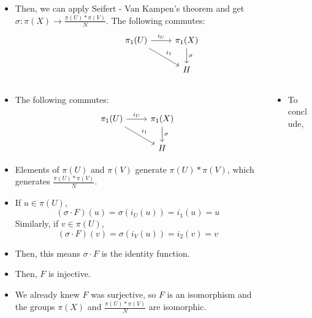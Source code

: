 \documentclass[8pt]{beamer}
\begin{document}
\begin{frame}
\begin{columns}
\begin{column}[T]{0.5\textwidth}
\begin{itemize}
          \item<5-> Then, we can apply Seifert - Van Kampen's theorem and get
            $\sigma :
              \pi(X) \rightarrow \frac{\pi(U)*\pi(V)}{N}$.
            The following commutes:
            \[\begin{tikzcd}[ampersand replacement=\&]
                \pi_1(U) \ar[rd, "i_1"] \ar[r, "i_U"] \&
                \pi_1(X) \ar[d, "\sigma"] \\ \& H \end{tikzcd}\]
          \end{itemize}
        \end{column}
    \end{columns}
  \end{frame}
  \begin{frame}
    \begin{columns}
      \begin{column}[T]{0.5\textwidth}
        \begin{itemize}
          \item<1-> The following commutes:
            \[\begin{tikzcd}[ampersand replacement=\&]
                \pi_1(U) \ar[rd, "i_1"] \ar[r, "i_U"] \&
                \pi_1(X) \ar[d, "\sigma"] \\ \& H \end{tikzcd}\]
          \item<2->
            Elements of $\pi(U)$ and $\pi(V)$ generate $\pi(U)*\pi(V)$,
            which generates $\frac{\pi(U)*\pi(V)}{N}$.
          \item<3->
            If $u \in \pi(U)$, 
            \[(\sigma \cdot F)(u) = \sigma(i_U(u)) = i_1(u) = u\]
            Similarly, if $v \in \pi(U)$,
            \[(\sigma \cdot F)(v) = \sigma(i_V(u)) = i_2(v) = v\]
          \item<4-> Then, this means $\sigma \cdot F$ is the identity function.
          \item<5-> Then, $F$ is injective.
          \item<6-> We already knew $F$ was surjective, so $F$ is an isomorphism and
            the groups $\pi(X)$ and $\frac{\pi(U)*\pi(V)}{N}$ are isomorphic.
        \end{itemize}
      \end{column}
      \begin{column}[T]{0.5\textwidth}
        \begin{itemize}
          \item<7-> To conclude,

\end{itemize}
\end{column}
\end{columns}
\end{frame}
\end{document}
